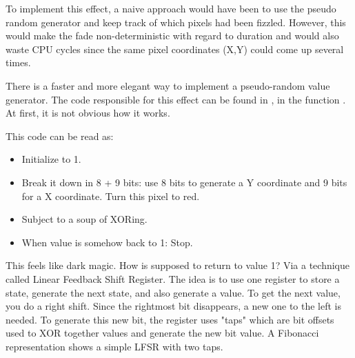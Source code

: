 To implement this effect, a naive approach would have been to use the pseudo random generator  and keep track of which pixels had been fizzled. However, this would make the fade non-deterministic with regard to duration and would also waste CPU cycles since the same pixel coordinates (X,Y) could come up several times.\\
\par
There is a faster and more elegant way to implement a pseudo-random value generator. The code responsible for this effect can be found in , in the function . At first, it is not obvious how it works.\\
\par
\begin{minipage}{\textwidth}

\end{minipage}
\par
This code can be read as:\\
\begin{itemize}
\item Initialize  to 1.
\item Break it down in 8 + 9 bits: use 8 bits to generate a Y coordinate and 9 bits for a X coordinate. Turn this pixel to red.
\item Subject  to a soup of XORing.
\item When  value is somehow back to 1: Stop.
\end{itemize}        
This feels like dark magic. How is  supposed to return to value 1? Via a technique called Linear Feedback Shift Register. The idea is to use one register to store a state, generate the next state, and also generate a value. To get the next value, you do a right shift. Since the rightmost bit disappears, a new one to the left is needed. To generate this new bit, the register uses "taps" which are bit offsets used to XOR together values and generate the new bit value. A Fibonacci representation shows a simple LFSR with two taps.\\
\par

